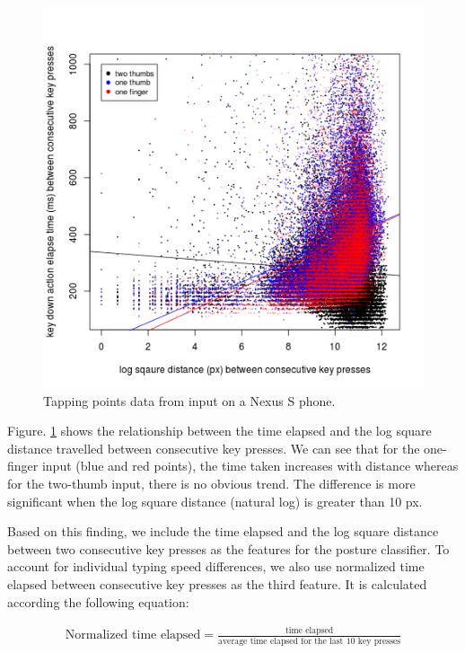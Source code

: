 \documentclass{sigchi}
\begin{document}
\begin{figure}[tb]
  \centering
  \includegraphics[width=1\columnwidth]{figures/time-distance.png}
  \caption{Tapping points data from input on a Nexus S phone.}
  \label{fig:time-distance}
\end{figure}

Figure. \ref{fig:time-distance} shows the relationship between the time elapsed 
and the log square distance travelled between consecutive key presses. We can
see that for the one-finger input (blue and red points), the time taken
increases with distance whereas for the two-thumb input, there is no obvious
trend. The difference is more significant when the log square distance (natural
log) is greater than 10 px.

Based on this finding, we include the time elapsed and the log square distance
between two consecutive key presses as the features for the posture classifier. 
To account for individual typing speed differences, we also use normalized time 
elapsed between consecutive key presses as the third feature. It is calculated according the following equation:

\begin{align}
\text{Normalized time elapsed} = \frac{\text{time elapsed}}{\text{average time
elapsed for the last 10 key presses}}
\end{align}
\end{document}
